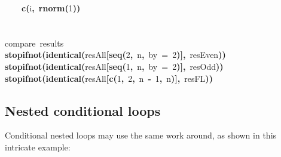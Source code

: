 \documentclass[a4paper,12pt]{article}\usepackage{graphicx, color}
\makeatletter
\newcommand{\hlnumber}[1]{\textcolor[rgb]{0,0,0}{#1}}%
\newcommand{\hlfunctioncall}[1]{\textcolor[rgb]{0.501960784313725,0,0.329411764705882}{\textbf{#1}}}%
\newcommand{\hlkeyword}[1]{\textcolor[rgb]{0,0,0}{\textbf{#1}}}%
\newcommand{\hlargument}[1]{\textcolor[rgb]{0.690196078431373,0.250980392156863,0.0196078431372549}{#1}}%
\newcommand{\hlcomment}[1]{\textcolor[rgb]{0.180392156862745,0.6,0.341176470588235}{#1}}%
\newcommand{\hlsymbol}[1]{\textcolor[rgb]{0,0,0}{#1}}%
\newcommand{\hlstd}[1]{\textcolor[rgb]{0,0,0}{#1}}%
\newenvironment{kframe}{%
 \def\FrameCommand##1{\hskip\@totalleftmargin \hskip-\fboxsep
 \colorbox{shadecolor}{##1}\hskip-\fboxsep
     \hskip-\linewidth \hskip-\@totalleftmargin \hskip\columnwidth}%
 \MakeFramed {\advance\hsize-\width
   \@totalleftmargin\z@ \linewidth\hsize
   \@setminipage}}%
 {\par\unskip\endMakeFramed}
\newenvironment{knitrout}{}{} %
\renewenvironment{knitrout}{\begin{footnotesize}}{\end{footnotesize}}
\makeatother
\begin{document}
\begin{knitrout}
\begin{kframe}
\begin{flushleft}
\hlstd{}{\ }{\ }{\ }{\ }\hlfunctioncall{c}\hlkeyword{(}\hlsymbol{i}\hlkeyword{,}{\ }\hlfunctioncall{rnorm}\hlkeyword{(}\hlnumber{1}\hlkeyword{)}\hlkeyword{)}\hspace*{\fill}\\
\hlstd{}\hlkeyword{\usebox{\hlnormalsizeboxclosebrace}}\hspace*{\fill}\\
\hlstd{}\hspace*{\fill}\\
\hlstd{}\hlcomment{\usebox{\hlnormalsizeboxhash}{\ }compare{\ }results}\hspace*{\fill}\\
\hlstd{}\hlfunctioncall{stopifnot}\hlkeyword{(}\hlfunctioncall{identical}\hlkeyword{(}\hlsymbol{resAll}\hlkeyword{[}\hlfunctioncall{seq}\hlkeyword{(}\hlnumber{2}\hlkeyword{,}{\ }\hlsymbol{n}\hlkeyword{,}{\ }\hlargument{by}{\ }\hlargument{=}{\ }\hlnumber{2}\hlkeyword{)}\hlkeyword{]}\hlkeyword{,}{\ }\hlsymbol{resEven}\hlkeyword{)}\hlkeyword{)}\hspace*{\fill}\\
\hlstd{}\hlfunctioncall{stopifnot}\hlkeyword{(}\hlfunctioncall{identical}\hlkeyword{(}\hlsymbol{resAll}\hlkeyword{[}\hlfunctioncall{seq}\hlkeyword{(}\hlnumber{1}\hlkeyword{,}{\ }\hlsymbol{n}\hlkeyword{,}{\ }\hlargument{by}{\ }\hlargument{=}{\ }\hlnumber{2}\hlkeyword{)}\hlkeyword{]}\hlkeyword{,}{\ }\hlsymbol{resOdd}\hlkeyword{)}\hlkeyword{)}\hspace*{\fill}\\
\hlstd{}\hlfunctioncall{stopifnot}\hlkeyword{(}\hlfunctioncall{identical}\hlkeyword{(}\hlsymbol{resAll}\hlkeyword{[}\hlfunctioncall{c}\hlkeyword{(}\hlnumber{1}\hlkeyword{,}{\ }\hlnumber{2}\hlkeyword{,}{\ }\hlsymbol{n}{\ }\hlkeyword{-}{\ }\hlnumber{1}\hlkeyword{,}{\ }\hlsymbol{n}\hlkeyword{)}\hlkeyword{]}\hlkeyword{,}{\ }\hlsymbol{resFL}\hlkeyword{)}\hlkeyword{)}\mbox{}
\normalfont
\end{flushleft}
\end{kframe}
\end{knitrout}


\subsection{Nested conditional loops}

Conditional nested loops may use the same work around, as shown in this intricate 
example:
\end{document}
